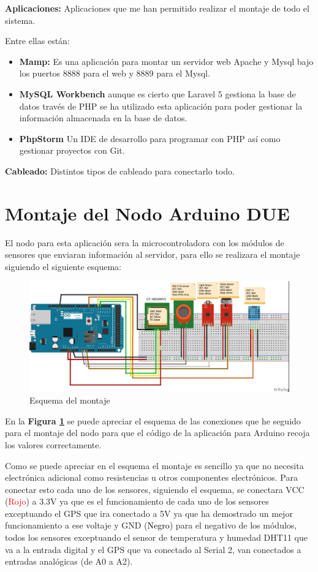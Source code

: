 \textbf{Aplicaciones: } Aplicaciones que me han permitido realizar el montaje de todo el sistema.

Entre ellas están:

\begin{itemize}
	\item \textbf{Mamp:} Es una aplicación para montar un servidor web Apache y Mysql bajo los puertos 8888 para el web y 8889 para el Mysql.
	\item \textbf{MySQL Workbench} aunque es cierto que Laravel 5 gestiona la base de datos través de PHP se ha utilizado esta aplicación para poder gestionar la información almacenada en la base de datos.
	\item \textbf{PhpStorm } Un IDE de desarrollo para programar con PHP así como gestionar proyectos con Git.
\end{itemize}

\textbf{Cableado:} Distintos tipos de cableado para conectarlo todo.

\section{Montaje del Nodo Arduino DUE}

\setlength{\parindent}{5ex}El nodo para esta aplicación sera la microcontroladora con los módulos de sensores que enviaran información al servidor, para ello se realizara el montaje siguiendo el siguiente esquema:\\
\setlength{\parindent}{0ex}
\begin{figure}[!h]
	\centering
	\includegraphics[width=0.9\linewidth]{figuras/ardschema}
	\caption{Esquema del montaje}
	\label{fig:imgdue}
\end{figure}

En la \textbf{Figura \ref{fig:imgdue}} se puede apreciar el esquema de las conexiones que he seguido para el montaje del nodo para que el código de la aplicación para Arduino recoja los valores correctamente.


Como se puede apreciar en el esquema el montaje es sencillo ya que no necesita electrónica adicional como resistencias u otros componentes electrónicos. Para conectar esto cada uno de los sensores, siguiendo el esquema, se conectara VCC (\textcolor{red}{Rojo}) a 3.3V ya que es el funcionamiento de cada uno de los sensores exceptuando el GPS que ira conectado a 5V ya que ha demostrado un mejor funcionamiento a ese voltaje y GND (\textcolor{black}{Negro}) para el negativo de los módulos, todos los sensores exceptuando el sensor de temperatura y humedad DHT11 que va a la entrada digital y el GPS que va conectado al Serial 2, van conectados a entradas analógicas (de A0 a A2).

